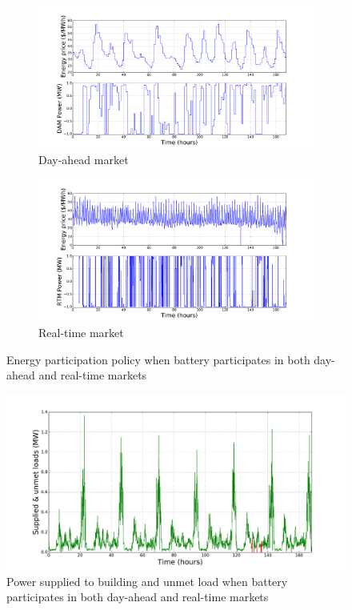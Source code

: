 \documentclass[11pt,twoside]{article}
\begin{document}
\begin{figure}[h!]
\begin{subfigure}{\textwidth}
\centering
\includegraphics[width=\linewidth]{Figures/Plots/fullproblem_stoch/Pdam_fp_st.pdf} \caption{Day-ahead market}\label{fig:Pdam_fp_st}
\end{subfigure}
\begin{subfigure}{\textwidth}
\centering
\includegraphics[width=\linewidth]{Figures/Plots/fullproblem_stoch/Prtm_fp_st.pdf} \caption{Real-time market}\label{fig:Prtm_fp_st}
\end{subfigure}
\caption{Energy participation policy when battery participates in both day-ahead and real-time markets}
\end{figure}
\FloatBarrier
\begin{figure}[h!]
\begin{center}
\includegraphics[scale = 0.4]{Figures/Plots/fullproblem_stoch/supp_unmet_fp_st.pdf} \caption{Power supplied to building and unmet load when battery participates in both day-ahead and real-time markets}\label{fig:supp_unmet_fp_st}
\end{center}
\end{figure}
\end{document}
